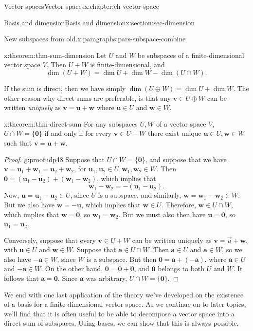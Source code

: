 \documentclass[oneside,10pt,]{book}
\numberwithin{equation}{section}
\newcommand{\uu}{\mathbf{u}}
\newcommand{\vv}{\mathbf{v}}
\newcommand{\ww}{\mathbf{w}}
\begin{document}
\begin{chapterptx}{Vector spaces}{}{Vector spaces}{}{}{x:chapter:ch-vector-space}
\begin{sectionptx}{Basis and dimension}{}{Basis and dimension}{}{}{x:section:sec-dimension}
\begin{paragraphs}{New subspaces from old.}{x:paragraphs:pars-subspace-combine}
\begin{theorem}{}{}{x:theorem:thm-sum-dimension}%
Let \(U\) and \(W\) be subspaces of a finite-dimensional vector space \(V\). Then \(U+W\) is finite-dimensional, and%
\begin{equation*}
\dim(U+W)=\dim U + \dim W - \dim(U\cap W)\text{.}
\end{equation*}
%
\end{theorem}
If the sum is direct, then we have simply \(\dim(U\oplus W) = \dim U + \dim W\). The other reason why direct sums are preferable, is that any \(\vv\in U\oplus W\) can be written \emph{uniquely} as \(\vv=\uu+\ww\) where \(\uu\in U\) and \(\ww\in W\).%
\begin{theorem}{}{}{x:theorem:thm-direct-sum}%
For any subspaces \(U,W\) of a vector space \(V\), \(U\cap W = \{\mathbf{0}\}\) if and only if for every \(\vv\in U+W\) there exist unique \(\uu\in U, \ww\in W\) such that \(\vv=\uu+\ww\).%
\end{theorem}
\begin{proof}{}{g:proof:idp48}
Suppose that \(U\cap W = \{\mathbf{0}\}\), and suppose that we have \(\vv = \uu_1+\ww_1 = \uu_2+\ww_2\), for \(\uu_1,\uu_2\in U,\ww_1,\ww_2\in W\). Then \(\mathbf{0}=(\uu_1-\uu_2)+(\ww_1-\ww_2)\), which implies that%
\begin{equation*}
\ww_1-\ww_2 = -(\uu_1-\uu_2)\text{.}
\end{equation*}
Now, \(\uu=\uu_1-\uu_2\in U\), since \(U\) is a subspace, and similarly, \(\ww=\ww_1-\ww_2\in W\). But we also have \(\ww=-\uu\), which implies that \(\ww\in U\). Therefore, \(\ww\in U\cap W\), which implies that \(\ww=\mathbf{0}\), so \(\ww_1=\ww_2\). But we must also then have \(\uu=\mathbf{0}\), so \(\uu_1=\uu_2\).%
\par
Conversely, suppose that every \(\vv\in U+W\) can be written uniquely as \(\vv=\vec{u}+\ww\), with \(\uu\in U\) and \(\ww\in W\). Suppose that \(\mathbf{a}\in U\cap W\). Then \(\mathbf{a}\in U\) and \(\mathbf{a}\in W\), so we also have \(-\mathbf{a}\in W\), since \(W\) is a subspace. But then \(\mathbf{0}=\mathbf{a}+(-\mathbf{a})\), where \(\mathbf{a}\in U\) and \(-\mathbf{a}\in W\). On the other hand, \(\mathbf{0}=\mathbf{0}+\mathbf{0}\), and \(\mathbf{0}\) belongs to both \(U\) and \(W\). It follows that \(\mathbf{a}=\mathbf{0}\). Since \(\mathbf{a}\) was arbitrary, \(U\cap W = \{\mathbf{0}\}\).%
\end{proof}
We end with one last application of the theory we've developed on the existence of a basis for a finite-dimensional vector space. As we continue on to later topics, we'll find that it is often useful to be able to decompose a vector space into a direct sum of subspaces. Using bases, we can show that this is always possible.%

\end{paragraphs}
\end{sectionptx}
\end{chapterptx}
\end{document}
